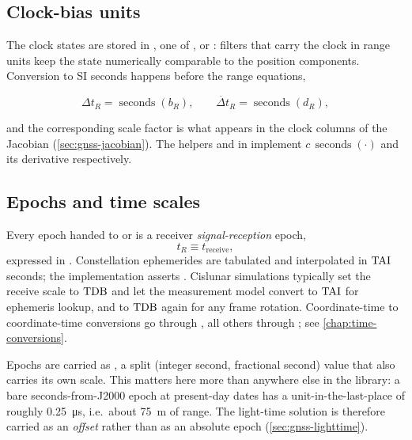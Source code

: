 \subsection{Clock-bias units}

The clock states are stored in , one of
,  or : filters that carry the
clock in range units keep the state numerically comparable to the position
components. Conversion to SI seconds happens before the range equations,

\begin{equation}
  \label{eq:gnss-clock-units}
  \Delta t_R = \operatorname{seconds}(b_R), \qquad
  \dot{\Delta t}_R = \operatorname{seconds}(d_R),
\end{equation}

and the corresponding scale factor is what appears in the clock columns of the
Jacobian (\cref{sec:gnss-jacobian}). The helpers
 and  in
 implement
$c\,\operatorname{seconds}(\cdot)$ and its derivative respectively.

\subsection{Epochs and time scales}

Every epoch handed to  or  is a receiver
\emph{signal-reception} epoch,
\begin{equation}
  \label{eq:gnss-epoch-def}
  t_R \equiv t_{\text{receive}},
\end{equation}
expressed in . Constellation ephemerides
are tabulated and interpolated in $\mathrm{TAI}$ seconds; the implementation asserts
. Cislunar simulations
typically set the receive scale to $\mathrm{TDB}$ and let the measurement model
convert to $\mathrm{TAI}$ for ephemeris lookup, and to $\mathrm{TDB}$ again for any frame
rotation. Coordinate-time to coordinate-time conversions go through
, all others through ; see
\cref{chap:time-conversions}.

Epochs are carried as , a split (integer second, fractional second)
value that also carries its own scale. This matters here more than anywhere
else in the library: a bare  seconds-from-J2000 epoch at
present-day dates has a unit-in-the-last-place of roughly
\SI{0.25}{\micro\second}, i.e.\ about \SI{75}{\meter} of range. The light-time
solution is therefore carried as an \emph{offset} rather than as an absolute
epoch (\cref{sec:gnss-lighttime}).

